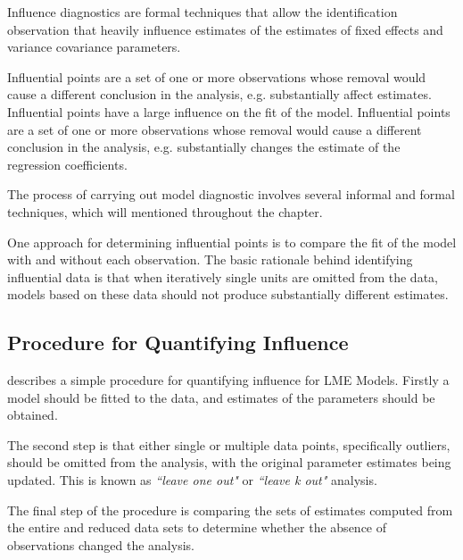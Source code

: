 \documentclass[12pt, a4paper]{report}
\theoremstyle{definition}
\theoremstyle{remark}
\begin{document}
Influence diagnostics are formal techniques that allow the identification observation that heavily influence estimates of the estimates of fixed effects and variance covariance parameters.


Influential points are a set of one or more observations whose removal would cause a different conclusion in the analysis, e.g. substantially affect estimates. 
Influential points have a large influence on the fit of the model. Influential points are a set of one or more observations whose removal would cause a different conclusion in the analysis, e.g. substantially changes the estimate of the regression coefficients. 




The process of carrying out model diagnostic involves several informal and formal techniques, which will mentioned throughout the chapter.




One approach for determining influential points is to compare the fit of the model with and without each observation. The basic rationale behind identifying influential data is that when iteratively single units are omitted from the data, models based on these data should not produce substantially different estimates. 


\subsection*{Procedure for Quantifying Influence}






\citet{schabenberger} describes a simple procedure for quantifying influence for LME Models. Firstly a model should be fitted to the data, and estimates of the parameters should be obtained. 

The second step is that either single or multiple data points, specifically outliers, should be omitted from the analysis, with the original parameter estimates being updated. This is known as \textit{``leave one out"} or \textit{``leave k out"} analysis. 

The final step of the procedure is comparing the sets of estimates computed from the entire and reduced data sets to determine whether the absence of observations changed the analysis. 



\end{document}
